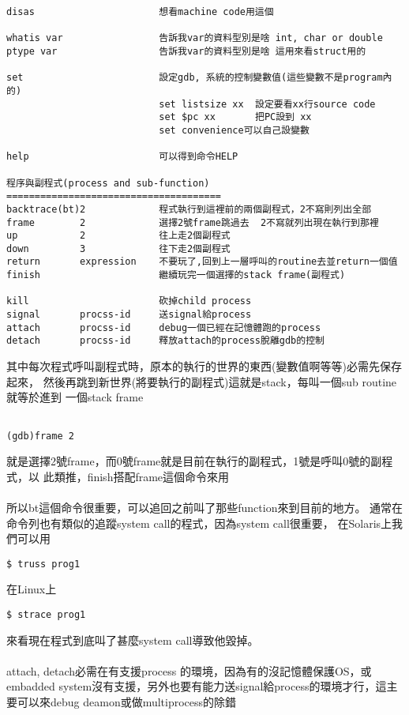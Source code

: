 \begin{verbatim}
disas                      想看machine code用這個

whatis var                 告訴我var的資料型別是啥 int, char or double
ptype var                  告訴我var的資料型別是啥 這用來看struct用的

set                        設定gdb, 系統的控制變數值(這些變數不是program內的)
                           set listsize xx  設定要看xx行source code
                           set $pc xx       把PC設到 xx
                           set convenience可以自己設變數

help                       可以得到命令HELP

程序與副程式(process and sub-function)
======================================
backtrace(bt)2             程式執行到這裡前的兩個副程式，2不寫則列出全部
frame        2             選擇2號frame跳過去  2不寫就列出現在執行到那裡
up           2             往上走2個副程式
down         3             往下走2個副程式
return       expression    不要玩了,回到上一層呼叫的routine去並return一個值
finish                     繼續玩完一個選擇的stack frame(副程式)

kill                       砍掉child process
signal       procss-id     送signal給process
attach       procss-id     debug一個已經在記憶體跑的process
detach       procss-id     釋放attach的process脫離gdb的控制
  \end{verbatim}
  其中每次程式呼叫副程式時，原本的執行的世界的東西(變數值啊等等)必需先保存起來，
  然後再跳到新世界(將要執行的副程式)這就是stack，每叫一個sub routine就等於進到
  一個stack frame
  \begin{verbatim}

(gdb)frame 2 

  \end{verbatim}
  就是選擇2號frame，而0號frame就是目前在執行的副程式，1號是呼叫0號的副程式，以
  此類推，finish搭配frame這個命令來用
  \\\\
  所以bt這個命令很重要，可以追回之前叫了那些function來到目前的地方。
  通常在命令列也有類似的追蹤system call的程式，因為system call很重要，
  在Solaris上我們可以用
  \begin{verbatim}  
$ truss prog1
  \end{verbatim}  
  在Linux上
  \begin{verbatim}  
$ strace prog1
  \end{verbatim}  
  來看現在程式到底叫了甚麼system call導致他毀掉。
  \\\\
  attach, detach必需在有支援process 的環境，因為有的沒記憶體保護OS，或embadded 
  system沒有支援，另外也要有能力送signal給process的環境才行，這主要可以來debug
  deamon或做multiprocess的除錯      
  
